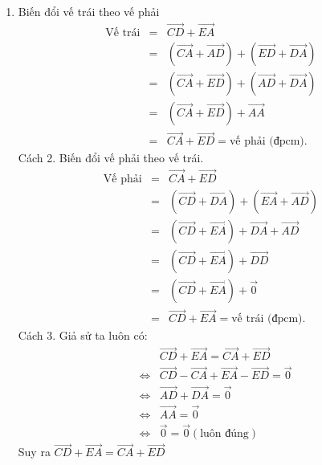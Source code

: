 \begin{bt}
{\begin{enumerate}
			Suy ra  $\overrightarrow{AB}+\overrightarrow{CD}+\overrightarrow{EA}=\overrightarrow{CB}+\overrightarrow{ED}$
			\item Biến đổi vế trái theo vế phải
			\begin{eqnarray*}
				\text{Vế trái}
				&=&\overrightarrow{CD}+\overrightarrow{EA}\\
				&=&\left(\overrightarrow{CA}+\overrightarrow{AD}\right)+\left(\overrightarrow{ED}+\overrightarrow{DA}\right)\\
				&=&\left(\overrightarrow{CA}+\overrightarrow{ED}\right)+\left(\overrightarrow{AD}+\overrightarrow{DA}\right)\\
				&=&\left(\overrightarrow{CA}+\overrightarrow{ED}\right)+\overrightarrow{AA}	\\			
				&=&\overrightarrow{CA}+\overrightarrow{ED}=\text{vế phải (đpcm).}
			\end{eqnarray*}
			Cách 2. Biến đổi vế phải theo vế trái.
			\begin{eqnarray*}
				\text{Vế phải}
				&=&\overrightarrow{CA}+\overrightarrow{ED}\\
				&=&\left(\overrightarrow{CD}+\overrightarrow{DA}\right)+\left(\overrightarrow{EA}+\overrightarrow{AD}\right)\\
				&=&\left(\overrightarrow{CD}+\overrightarrow{EA}\right)+\overrightarrow{DA}+\overrightarrow{AD}\\
				&=&\left(\overrightarrow{CD}+\overrightarrow{EA}\right)+\overrightarrow{DD}\\
				&=&\left(\overrightarrow{CD}+\overrightarrow{EA}\right)+\overrightarrow{0}\\
				&=&\overrightarrow{CD}+\overrightarrow{EA}=\text{vế trái (đpcm).}
			\end{eqnarray*}
			Cách 3. Giả sử ta luôn có:
			\begin{eqnarray*}
				& &\overrightarrow{CD}+\overrightarrow{EA}=\overrightarrow{CA}+\overrightarrow{ED}\\
				&\Leftrightarrow& \overrightarrow{CD}-\overrightarrow{CA}+\overrightarrow{EA}-\overrightarrow{ED}=\overrightarrow{0}\\
				&\Leftrightarrow& \overrightarrow{AD}+\overrightarrow{DA}=\overrightarrow{0}\\
				& \Leftrightarrow& \overrightarrow{AA}=\overrightarrow{0}\\
				&\Leftrightarrow &\overrightarrow{0}=\overrightarrow{0} (\text{luôn đúng})
			\end{eqnarray*} 
			Suy ra  $\overrightarrow{CD}+\overrightarrow{EA}=\overrightarrow{CA}+\overrightarrow{ED}$
		\end{enumerate}
	}
\end{bt}

